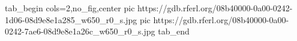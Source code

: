  
 
 
 
 


\ifcmt
  tab_begin cols=2,no_fig,center
     pic https://gdb.rferl.org/08b40000-0a00-0242-1d06-08d9e8e1a285_w650_r0_s.jpg
     pic https://gdb.rferl.org/08b40000-0a00-0242-7ae6-08d9e8e1a26c_w650_r0_s.jpg
  tab_end
\fi
